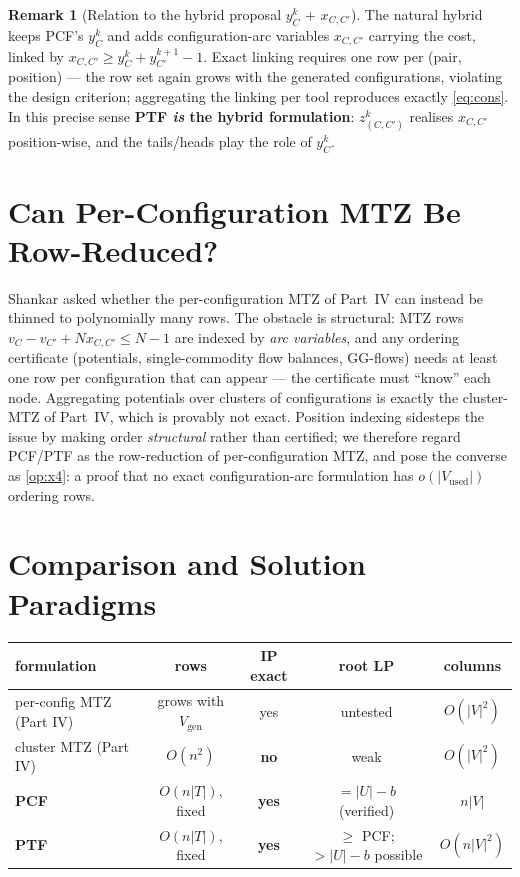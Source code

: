 \documentclass[11pt,a4paper]{article}
\theoremstyle{plain}
\theoremstyle{definition}
\newtheorem{remark}[theorem]{Remark}
\begin{document}
\begin{remark}[Relation to the hybrid proposal $y_C^k$ $+$ $x_{C,C'}$]
\label{rem:hybrid}
The natural hybrid keeps PCF's $y_C^k$ and adds configuration-arc variables
$x_{C,C'}$ carrying the cost, linked by $x_{C,C'}\ge y_C^k+y_{C'}^{k+1}-1$. Exact
linking requires one row per (pair, position) --- the row set again grows with the
generated configurations, violating the design criterion; aggregating the linking
per tool reproduces exactly \eqref{eq:cons}. In this precise sense \textbf{PTF
\emph{is} the hybrid formulation}: $z^k_{(C,C')}$ realises $x_{C,C'}$
position-wise, and the tails/heads play the role of $y_C^k$.
\end{remark}

\section{Can Per-Configuration MTZ Be Row-Reduced?}
\label{sec:mtzreduce}

Shankar asked whether the per-configuration MTZ of Part~IV can instead be thinned to
polynomially many rows. The obstacle is structural: MTZ rows
$v_C-v_{C'}+Nx_{C,C'}\le N-1$ are indexed by \emph{arc variables}, and any ordering
certificate (potentials, single-commodity flow balances, GG-flows) needs at least
one row per configuration that can appear --- the certificate must ``know'' each
node. Aggregating potentials over clusters of configurations is exactly the
cluster-MTZ of Part~IV, which is provably not exact. Position indexing sidesteps the
issue by making order \emph{structural} rather than certified; we therefore regard
PCF/PTF as the row-reduction of per-configuration MTZ, and pose the converse as
\cref{op:x4}: a proof that no exact configuration-arc formulation has
$o(|V_{\mathrm{used}}|)$ ordering rows.

\section{Comparison and Solution Paradigms}
\label{sec:verdict}

\begin{center}
\renewcommand{\arraystretch}{1.3}
\begin{tabular}{lcccc}
\toprule
formulation & rows & IP exact & root LP & columns\\
\midrule
per-config MTZ (Part IV) & grows with $V_{\mathrm{gen}}$ & yes & untested & $O(|V|^2)$\\
cluster MTZ (Part IV) & $O(n^2)$ & \textbf{no} & weak & $O(|V|^2)$\\
\textbf{PCF} & $O(n|T|)$, fixed & \textbf{yes} & $=|U|-b$ (verified) & $n|V|$\\
\textbf{PTF} & $O(n|T|)$, fixed & \textbf{yes} & $\ge$ PCF; $>|U|-b$ possible & $O(n|V|^2)$\\
\bottomrule
\end{tabular}
\end{center}
\end{document}
